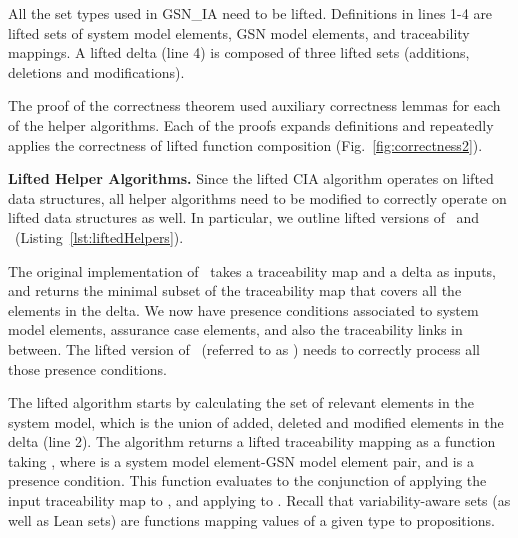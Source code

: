 All the set types used in GSN\_IA need to be lifted. Definitions in lines 1-4 are lifted sets of system model elements, GSN model elements, and traceability mappings. A lifted delta (line 4) is composed of three lifted sets (additions, deletions and modifications).

The proof of the correctness theorem used auxiliary correctness lemmas for each of the helper algorithms. Each of the proofs expands definitions and repeatedly applies the correctness of lifted function composition (Fig.~\ref{fig:correctness2}). 

\vspace{0.1in}
\noindent
{\bf Lifted Helper Algorithms.}
\label{sec:lifted_helpers}
Since the lifted CIA algorithm operates on lifted data structures, all helper algorithms need to be modified to correctly operate on lifted data structures as well. In particular, we outline lifted versions of \restrict~and \trace~(Listing~\ref{lst:liftedHelpers}).

The original implementation of \restrict~takes a traceability map and a delta as inputs, and returns the minimal subset of the traceability map that covers all the elements in the delta. We now have presence conditions associated to system model elements, assurance case elements, and also the traceability links in between. The lifted version of \restrict~(referred to as \lift{\restrict}) needs to correctly process all those presence conditions.

The lifted algorithm starts by calculating the set of relevant elements in the system model, which is the union of added, deleted and modified elements in the delta (line 2). The algorithm returns a lifted traceability mapping as a function taking , where  is a system model element-GSN model element pair, and  is a presence condition. This function evaluates to the conjunction of applying the input traceability map  to , and applying  to . Recall that variability-aware sets (as well as Lean sets) are functions mapping values of a given type to propositions.


